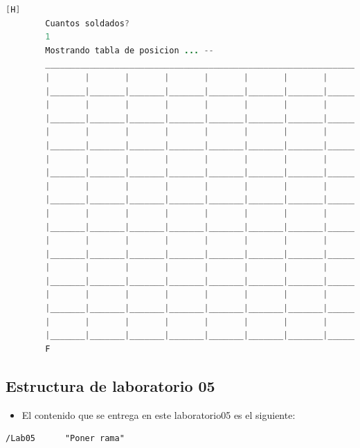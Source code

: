 \documentclass{article}
\begin{document}
	\begin{lstlisting}[language=java,caption={Las lineas de codigos del metodo creado: \textcolor{red}{VER EL TEXTO EN LATEX EN LA IMAGEN SE DEFORMA O EJECUTARLO}}][H]
		Cuantos soldados? 
		1
		Mostrando tabla de posicion ... --
		_________________________________________________________________________________
		|       |       |       |       |       |       |       |       |       |       |
		|_______|_______|_______|_______|_______|_______|_______|_______|_______|_______|
		|       |       |       |       |       |       |       |       |       |       |
		|_______|_______|_______|_______|_______|_______|_______|_______|_______|_______|
		|       |       |       |       |       |       |       |       |       |       |
		|_______|_______|_______|_______|_______|_______|_______|_______|_______|_______|
		|       |       |       |       |       |       |       |       |       |       |
		|_______|_______|_______|_______|_______|_______|_______|_______|_______|_______|
		|       |       |       |       |       |       |       |       |       |       |
		|_______|_______|_______|_______|_______|_______|_______|_______|_______|_______|
		|       |       |       |       |       |       |       |       |       |       |
		|_______|_______|_______|_______|_______|_______|_______|_______|_______|_______|
		|       |       |       |       |       |       |       |       |       |       |
		|_______|_______|_______|_______|_______|_______|_______|_______|_______|_______|
		|       |       |       |       |       |       |       |       |       |       |
		|_______|_______|_______|_______|_______|_______|_______|_______|_______|_______|
		|       |       |       |       |       |       |       |       |       |       |
		|_______|_______|_______|_______|_______|_______|_______|_______|_______|_______|
		|       |       |       |       |       |       |       |       |       |       |
		|_______|_______|_______|_______|_______|_______|_______|_______|_______|_______|
		F
	\end{lstlisting}
	
	\subsection{Estructura de laboratorio 05}
	\begin{itemize}	
		\item El contenido que se entrega en este laboratorio05 es el siguiente:
	\end{itemize}
	\begin{lstlisting}[style=ascii-tree]
	/Lab05 		"Poner rama"

	\end{lstlisting}    
\end{document}
